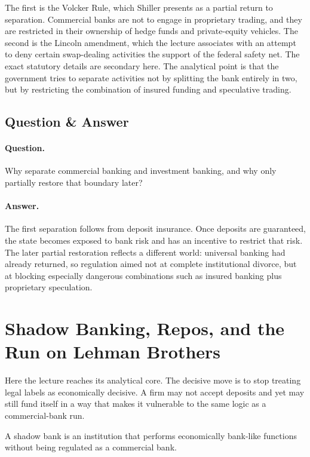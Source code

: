 The first is the Volcker Rule, which Shiller presents as a partial return to separation. Commercial banks are not to engage in proprietary trading, and they are restricted in their ownership of hedge funds and private-equity vehicles. The second is the Lincoln amendment, which the lecture associates with an attempt to deny certain swap-dealing activities the support of the federal safety net. The exact statutory details are secondary here. The analytical point is that the government tries to separate activities not by splitting the bank entirely in two, but by restricting the combination of insured funding and speculative trading.

\subsection{Question \& Answer}

\paragraph{Question.} Why separate commercial banking and investment banking, and why only partially restore that boundary later?

\paragraph{Answer.} The first separation follows from deposit insurance. Once deposits are guaranteed, the state becomes exposed to bank risk and has an incentive to restrict that risk. The later partial restoration reflects a different world: universal banking had already returned, so regulation aimed not at complete institutional divorce, but at blocking especially dangerous combinations such as insured banking plus proprietary speculation.

\section{Shadow Banking, Repos, and the Run on Lehman Brothers}

Here the lecture reaches its analytical core. The decisive move is to stop treating legal labels as economically decisive. A firm may not accept deposits and yet may still fund itself in a way that makes it vulnerable to the same logic as a commercial-bank run.

\begin{definition}
A shadow bank is an institution that performs economically bank-like functions without being regulated as a commercial bank.
\end{definition}

